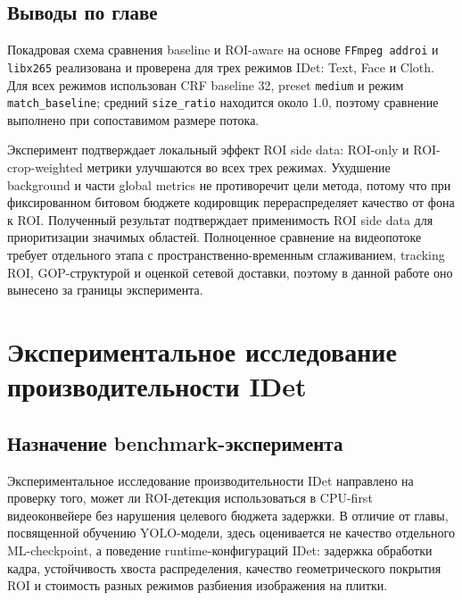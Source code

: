 \documentclass[12pt,a4paper,oneside,openany]{report}
\begin{document}

\section{Выводы по главе}

Покадровая схема сравнения baseline и ROI-aware на основе \texttt{FFmpeg addroi} и \texttt{libx265}
реализована и проверена для трех режимов IDet: Text, Face и Cloth. Для всех режимов использован
CRF baseline 32, preset \texttt{medium} и режим \texttt{match\_baseline}; средний
\texttt{size\_ratio} находится около 1.0, поэтому сравнение выполнено при сопоставимом размере
потока.

Эксперимент подтверждает локальный эффект ROI side data: ROI-only и ROI-crop-weighted метрики
улучшаются во всех трех режимах. Ухудшение background и части global metrics не противоречит
цели метода, потому что при фиксированном битовом бюджете кодировщик перераспределяет качество
от фона к ROI. Полученный результат подтверждает применимость ROI side data для приоритизации
значимых областей. Полноценное сравнение на видеопотоке требует отдельного этапа с
пространственно-временным сглаживанием, tracking ROI, GOP-структурой и оценкой сетевой доставки,
поэтому в данной работе оно вынесено за границы эксперимента.


\chapter{Экспериментальное исследование производительности IDet}


\section{Назначение benchmark-эксперимента}

Экспериментальное исследование производительности IDet направлено на проверку того, может ли
ROI-детекция использоваться в CPU-first видеоконвейере без нарушения целевого бюджета задержки.
В отличие от главы, посвященной обучению YOLO-модели, здесь оценивается не качество отдельного
ML-checkpoint, а поведение runtime-конфигураций IDet: задержка обработки кадра, устойчивость
хвоста распределения, качество геометрического покрытия ROI и стоимость разных режимов разбиения
изображения на плитки.
\end{document}
